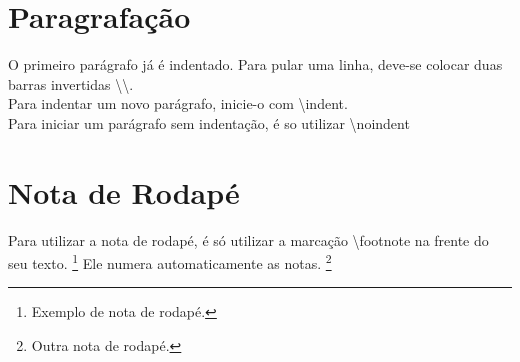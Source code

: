 \section{Paragrafação}
O primeiro parágrafo já é indentado. Para pular uma linha, deve-se colocar duas barras invertidas \textbackslash \textbackslash. \\
\indent Para indentar um novo parágrafo, inicie-o com \textbackslash indent.\\
\noindent Para iniciar um parágrafo sem indentação, é so utilizar \textbackslash noindent

\section{Nota de Rodapé}
Para utilizar a nota de rodapé, é só utilizar a marcação \textbackslash footnote na frente do seu texto. \footnote{Exemplo de nota de rodapé.} Ele numera automaticamente as notas. \footnote{Outra nota de rodapé.}

